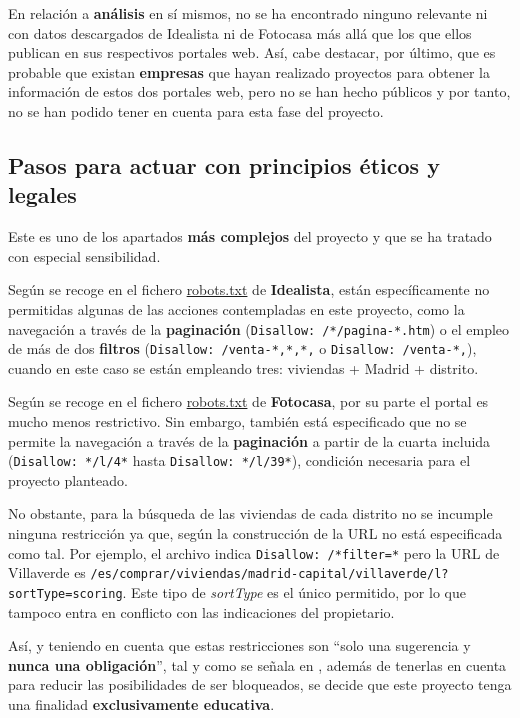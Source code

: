 \documentclass[12pt]{article}
\begin{document}
En relación a \textbf{análisis} en sí mismos, no se ha encontrado ninguno relevante ni con datos descargados de Idealista ni de Fotocasa más allá que los que ellos publican en sus respectivos portales web. Así, cabe destacar, por último, que es probable que existan \textbf{empresas} que hayan realizado proyectos para obtener la información de estos dos portales web, pero no se han hecho públicos y por tanto, no se han podido tener en cuenta para esta fase del proyecto. 

\vspace{-1.5em}\subsection*{Pasos para actuar con principios éticos y legales}\vspace{-1.0em}

Este es uno de los apartados \textbf{más complejos} del proyecto y que se ha tratado con especial sensibilidad.

Según se recoge en el fichero \href{https://www.idealista.com/robots.txt}{robots.txt} de \textbf{Idealista}, están específicamente no permitidas algunas de las acciones contempladas en este proyecto, como la navegación a través de la \textbf{paginación} (\verb|Disallow: /*/pagina-*.htm|) o el empleo de más de dos \textbf{filtros} (\verb|Disallow: /venta-*,*,*,| o \verb|Disallow: /venta-*,|), cuando en este caso se están empleando tres: viviendas + Madrid + distrito. 

Según se recoge en el fichero \href{https://www.fotocasa.es/robots.txt}{robots.txt} de \textbf{Fotocasa}, por su parte el portal es mucho menos restrictivo. Sin embargo, también está especificado que no se permite la navegación a través de la \textbf{paginación} a partir de la cuarta incluida (\verb|Disallow: */l/4*| hasta \verb|Disallow: */l/39*|), condición necesaria para el proyecto planteado.

No obstante, para la búsqueda de las viviendas de cada distrito no se incumple ninguna restricción ya que, según la construcción de la URL no está especificada como tal. Por ejemplo, el archivo indica \verb|Disallow: /*filter=*| pero la URL de Villaverde es \verb|/es/comprar/viviendas/madrid-capital/villaverde/l?sortType=scoring|. Este tipo de \textit{sortType} es el único permitido, por lo que tampoco entra en conflicto con las indicaciones del propietario. 

Así, y teniendo en cuenta que estas restricciones son ``solo una sugerencia y \textbf{nunca una obligación}'', tal y como se señala en \cite{tip2}, además de tenerlas en cuenta para reducir las posibilidades de ser bloqueados, se decide que este proyecto tenga una finalidad \textbf{exclusivamente educativa}. 
\end{document}
